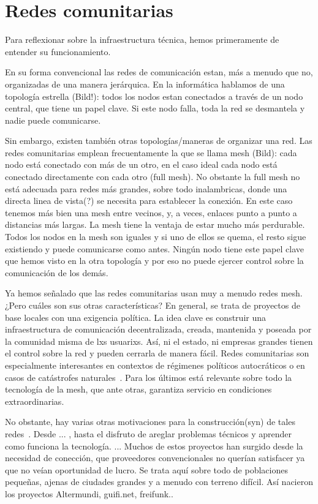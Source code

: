 \section{Redes comunitarias}

Para reflexionar sobre la infraestructura técnica, hemos primeramente de entender su funcionamiento.

En su forma convencional las redes de comunicación estan, más a menudo que no, organizadas de una manera jerárquica.
En la informática hablamos de una topología estrella (Bild!): todos los nodos estan conectados a través de un nodo central,
que tiene un papel clave.
Si este nodo falla, toda la red se desmantela y nadie puede comunicarse.

Sin embargo, existen también otras topologías/maneras de organizar una red.
Las redes comunitarias emplean frecuentamente la que se llama mesh (Bild):
cada nodo está conectado con más de un otro, en el caso ideal cada nodo está conectado directamente con cada otro (full mesh).
No obstante la full mesh no está adecuada para redes más grandes, sobre todo inalambricas, donde una directa linea de vista(?) se necesita para establecer la conexión.
En este caso tenemos más bien una mesh entre vecinos, y, a veces, enlaces punto a punto a distancias más largas.
La mesh tiene la ventaja de estar mucho más perdurable.
Todos los nodos en la mesh son iguales y si uno de ellos se quema, el resto sigue existiendo y puede comunicarse como antes.
Ningún nodo tiene este papel clave que hemos visto en la otra topología y por eso no puede ejercer control sobre la comunicación de los demás.

Ya hemos señalado que las redes comunitarias usan muy a menudo redes mesh.
¿Pero cuáles son sus otras características?
En general, se trata de proyectos de base locales con una exigencia política.
La idea clave es construir una infraestructura de comunicación decentralizada, creada, mantenida y poseada por la comunidad misma de lxs usuarixs.
Así, ni el estado, ni empresas grandes tienen el control sobre la red y pueden cerrarla de manera fácil.
Redes comunitarias son especialmente interesantes en contextos de régimenes políticos autocráticos o en casos de catástrofes naturales~\autocite{Mabb2014}.
Para los últimos está relevante sobre todo la tecnología de la mesh, que ante otras, garantiza servicio en condiciones extraordinarias.

No obstante, hay varias otras motivaciones para la construcción(syn) de tales redes~\autocite{Vaseva2016b}.
Desde ... , hasta el disfruto de areglar problemas técnicos y aprender como funciona la tecnología.
...
Muchos de estos proyectos han surgido desde la necesidad de conección, que proveedores convencionales no querían satisfacer ya que no veían oportunidad de lucro.
Se trata aquí sobre todo de poblaciones pequeñas, ajenas de ciudades grandes y a menudo con terreno difícil.
Así nacieron los proyectos Altermundi, guifi.net, freifunk..




